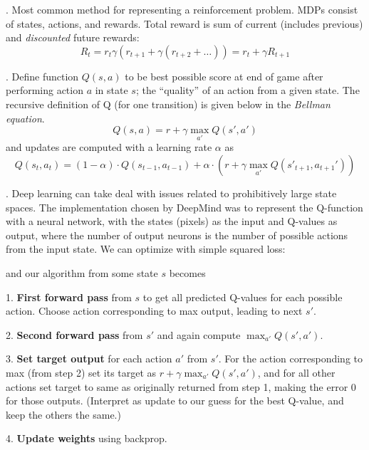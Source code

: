 \documentclass[11pt]{article}
\begin{document}
\myspace
\p {}. Most common method for representing a reinforcement problem. MDPs consist of states, actions, and rewards. Total reward is sum of current (includes previous) and \textit{discounted} future rewards:
\begin{equation}
R_t = r_t \gamma(r_{t + 1}
+ \gamma(r_{t + 2} + \ldots)) = r_t + \gamma R_{t + 1}
\end{equation}

\myspace
\p {}. Define function $Q(s, a)$ to be best possible score at end of game after performing action $a$ in state $s$; the ``quality'' of an action from a given state. The recursive definition of Q (for one transition) is given below in the \textit{Bellman equation}. 
$$ Q(s, a) = r + \gamma \max_{a'} Q(s', a') $$
and updates are computed with a learning rate $\alpha$ as
$$ Q(s_t, a_t) = (1 - \alpha)\cdot Q(s_{t -1}, a_{t - 1})
+ 	\alpha \cdot (r + \gamma \max_{a'} Q(s'_{t + 1}, a_{t+1}') ) $$

\myspace
\p {}. Deep learning can take deal with issues related to prohibitively large state spaces. The implementation chosen by DeepMind was to represent the Q-function with a neural network, with the states (pixels) as the input and Q-values as output, where the number of output neurons is the number of possible actions from the input state. We can optimize with simple squared loss:


and our algorithm from some state $s$ becomes
\begin{compactitem}
	\item[1.] \textbf{First forward pass} from $s$ to get all predicted Q-values for each possible action. Choose action corresponding to max output, leading to next $s'$.
	
	\item[2.] \textbf{Second forward pass} from $s'$ and again compute $\max_{a'} Q(s', a')$. 
	
	\item[3.] \textbf{Set target output} for each action $a'$ from $s'$. For the action corresponding to max (from step 2) set its target as $r + \gamma \max_{a'} Q(s', a')$, and for all other actions set target to same as originally returned from step 1, making the error 0 for those outputs. (Interpret as update to our guess for the best Q-value, and keep the others the same.)
	
	\item[4.] \textbf{Update weights} using backprop. 
\end{compactitem}
\end{document}
